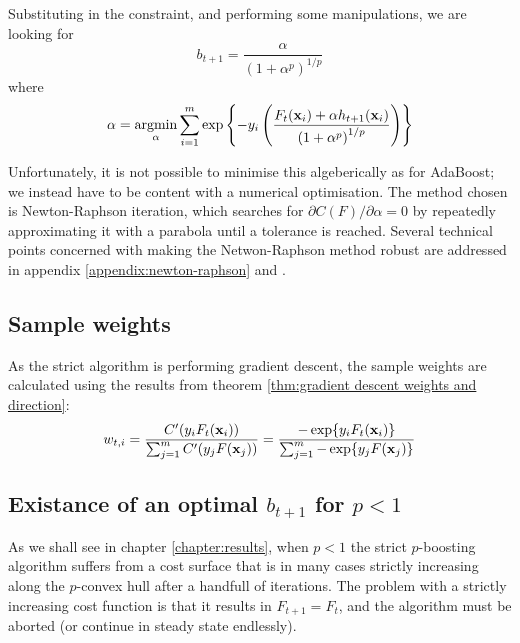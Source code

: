 Substituting in the constraint, and performing some manipulations, we
are looking for
%
\begin{equation}
b_{t+1} = \frac{\alpha}{\left( 1 + \alpha^p \right) ^ {1/p}}
\end{equation}
%
where
%
\begin{equation}
\alpha = \argmin_{\alpha} \sum_{i=1}^{m} \exp \left\{ -y_i \left(
\frac{F_{t}(\bfx_i) + \alpha h_{t+1}(\bfx_i)}{\left( 1 + \alpha ^p
\right) ^{1/p}} \right) \right\}
\label{eqn:strict minimise function}
\end{equation}

Unfortunately, it is not possible to minimise this algeberically as
for AdaBoost; we instead have to be content with a numerical
optimisation.  The method chosen is Newton-Raphson iteration, which
searches for $\partial C(F) / \partial \alpha = 0$ by repeatedly
approximating it with a parabola until a tolerance is reached.
Several technical points concerned with making the Netwon-Raphson
method robust are addressed in appendix \ref{appendix:newton-raphson}
and \cite{Heath97}.

\subsection{Sample weights}

As the strict algorithm is performing gradient descent, the sample
weights are calculated using the results from theorem
\ref{thm:gradient descent weights and direction}:
%
\begin{equation}
w_{t,i} = \frac{C'(y_i F_t (\mathbf{x}_i))}{\sum_{j=1}^{m} C'(y_j
F(\mathbf{x}_j))} = \frac{- \exp \{ y_i F_t (\mathbf{x}_i)\}}{\sum_{j=1}^{m} -
\exp \{y_j F(\mathbf{x}_j)\}}
\end{equation}

\subsection{Existance of an optimal $b_{t+1}$ for $p < 1$}

As we shall see in chapter \ref{chapter:results}, when $p < 1$ the
strict $p$-boosting algorithm suffers from a cost surface that is in
many cases strictly increasing along the $p$-convex hull after a
handfull of iterations.  The problem with a strictly increasing cost
function is that it results in $F_{t+1} = F_t$, and the algorithm must
be aborted (or continue in steady state endlessly).

